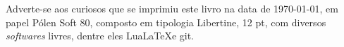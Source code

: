 \pagebreak

\ifodd\thepage\blankpage\fi

\parindent=0pt
\footnotesize\thispagestyle{empty}









\mbox{}\vfill
\begin{center}
		\begin{minipage}{.7\textwidth}\tiny\noindent{}
		\centering\tiny
Adverte-se aos curiosos que se imprimiu este livro na data de \today, em papel 
		Pólen Soft 80, composto em tipologia Libertine, 12 pt, 
		com diversos \textit{softwares} livres,
		dentre eles Lua\LaTeX e git.\\ 
		\medskip\\\
		\end{minipage}
\end{center}
